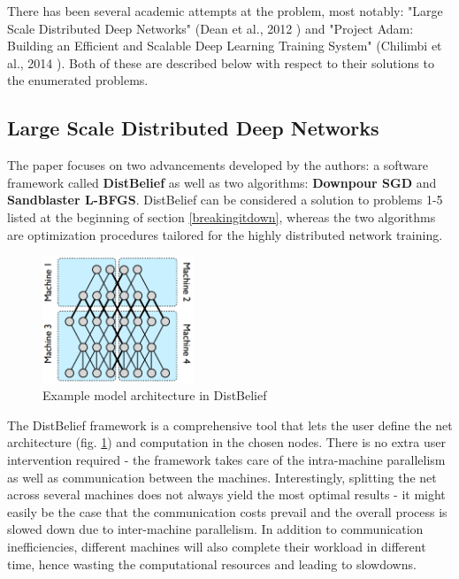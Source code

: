 \documentclass[a4paper, 12pt]{article}
\numberwithin{equation}{section}
\begin{document}
	There has been several academic attempts at the problem, most notably: "Large Scale Distributed Deep Networks" (Dean et al., 2012 \cite{dean2012large}) and "Project Adam: Building an Efficient and Scalable Deep Learning Training System" (Chilimbi et al., 2014 \cite{chilimbi2014project}). Both of these are described below with respect to their solutions to the enumerated problems.

	\subsection{Large Scale Distributed Deep Networks}

	The paper focuses on two advancements developed by the authors: a software framework called \textbf{DistBelief} as well as two algorithms: \textbf{Downpour SGD} and \textbf{Sandblaster L-BFGS}. DistBelief can be considered a solution to problems 1-5 listed at the beginning of section \ref{breakingitdown}, whereas the two algorithms are optimization procedures tailored for the highly distributed network training.

	\begin{figure}[H]
		\centering
		\includegraphics[width=0.40\textwidth]{distbelief.png}
		\caption{\label{fig:distbelief}Example model architecture in DistBelief \cite{dean2012large}}
	\end{figure}

	The DistBelief framework is a comprehensive tool that lets the user define the net architecture (fig. \ref{fig:distbelief}) and computation in the chosen nodes. There is no extra user intervention required - the framework takes care of the intra-machine parallelism as well as communication between the machines. Interestingly, splitting the net across several machines does not always yield the most optimal results - it might easily be the case that the communication costs prevail and the overall process is slowed down due to inter-machine parallelism. In addition to communication inefficiencies, different machines will also complete their workload in different time, hence wasting the computational resources and leading to slowdowns.
\end{document}
